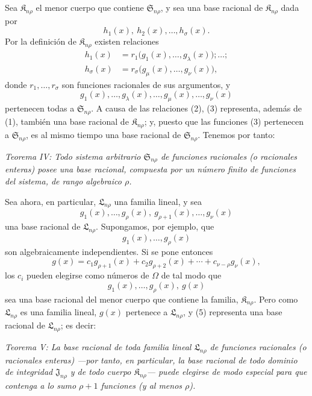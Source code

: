 \documentclass[11pt]{article}
\providecommand{\Kfield}{\mathfrak{K}}
\providecommand{\Ssys}{\mathfrak{S}}
\providecommand{\Lsys}{\mathfrak{L}}
\providecommand{\Jdom}{\mathfrak{J}}
\begin{document}
Sea $\Kfield_{n\rho}$ el menor cuerpo que contiene $\Ssys_{n\rho}$, y sea una base racional de $\Kfield_{n\rho}$ dada por
\begin{equation}
  h_1(x),\ h_2(x),\ldots,h_\sigma(x).
\tag{1}
\end{equation}
Por la definición de $\Kfield_{n\rho}$ existen relaciones
\begin{equation}
\begin{aligned}
 h_1(x)&=r_1\bigl(g_1(x),\ldots,g_\lambda(x)\bigr);\ldots;\\
 h_\sigma(x)&=r_\sigma\bigl(g_\mu(x),\ldots,g_\nu(x)\bigr),
\end{aligned}
\tag{2}
\end{equation}
donde $r_1,
\ldots,r_\sigma$ son funciones racionales de sus argumentos, y
\begin{equation}
  g_1(x),\ldots,g_\lambda(x),\ldots,
  g_\mu(x),\ldots,g_\nu(x)
\tag{3}
\end{equation}
pertenecen todas a $\Ssys_{n\rho}$. A causa de las relaciones (2), (3) representa, además de (1), también una base racional de $\Kfield_{n\rho}$; y, puesto que las funciones (3) pertenecen a $\Ssys_{n\rho}$, es al mismo tiempo una base racional de $\Ssys_{n\rho}$. Tenemos por tanto:

\emph{Teorema IV: Todo sistema arbitrario $\Ssys_{n\rho}$ de funciones racionales (o racionales enteras) posee una base racional, compuesta por un número finito de funciones del sistema, de rango algebraico $\rho$.}

Sea ahora, en particular, $\Lsys_{n\rho}$ una familia lineal, y sea
\begin{equation}
  g_1(x),\ldots,g_\rho(x),\ g_{\rho+1}(x),\ldots,g_\nu(x)
\tag{4}
\end{equation}
una base racional de $\Lsys_{n\rho}$. Supongamos, por ejemplo, que
\[
  g_1(x),\ldots,g_\rho(x)
\]
son algebraicamente independientes. Si se pone entonces
\[
  g(x)=c_1g_{\rho+1}(x)+c_2g_{\rho+2}(x)+\cdots+c_{\nu-\rho}g_\nu(x),
\]
los $c_i$ pueden elegirse como números de $\Omega$ de tal modo que
\begin{equation}
  g_1(x),\ldots,g_\rho(x),\ g(x)
\tag{5}
\end{equation}
sea una base racional del menor cuerpo que contiene la familia, $\Kfield_{n\rho}$. Pero como $\Lsys_{n\rho}$ es una familia lineal, $g(x)$ pertenece a $\Lsys_{n\rho}$, y (5) representa una base racional de $\Lsys_{n\rho}$; es decir:

\emph{Teorema V: La base racional de toda familia lineal $\Lsys_{n\rho}$ de funciones racionales (o racionales enteras) ---por tanto, en particular, la base racional de todo dominio de integridad $\Jdom_{n\rho}$ y de todo cuerpo $\Kfield_{n\rho}$--- puede elegirse de modo especial para que contenga a lo sumo $\rho+1$ funciones (y al menos $\rho$).}
\end{document}
